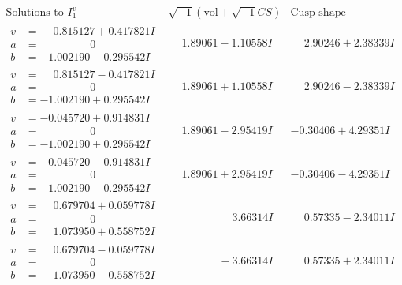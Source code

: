 \documentclass[1p]{elsarticle_modified}
\theoremstyle{definition}
\newcommand{\I}{\sqrt{-1}}
\begin{document}
$$\begin{array}{c|c|c}  
\text{Solutions to }I^v_{1}& \I (\text{vol} + \sqrt{-1}CS) & \text{Cusp shape}\\
 \hline 
\begin{aligned}
v &= \phantom{-}0.815127 + 0.417821 I \\
a &= \phantom{-0.000000 } 0 \\
b &= -1.002190 - 0.295542 I\end{aligned}
 & \phantom{-}1.89061 - 1.10558 I & \phantom{-}2.90246 + 2.38339 I \\ \hline\begin{aligned}
v &= \phantom{-}0.815127 - 0.417821 I \\
a &= \phantom{-0.000000 } 0 \\
b &= -1.002190 + 0.295542 I\end{aligned}
 & \phantom{-}1.89061 + 1.10558 I & \phantom{-}2.90246 - 2.38339 I \\ \hline\begin{aligned}
v &= -0.045720 + 0.914831 I \\
a &= \phantom{-0.000000 } 0 \\
b &= -1.002190 + 0.295542 I\end{aligned}
 & \phantom{-}1.89061 - 2.95419 I & -0.30406 + 4.29351 I \\ \hline\begin{aligned}
v &= -0.045720 - 0.914831 I \\
a &= \phantom{-0.000000 } 0 \\
b &= -1.002190 - 0.295542 I\end{aligned}
 & \phantom{-}1.89061 + 2.95419 I & -0.30406 - 4.29351 I \\ \hline\begin{aligned}
v &= \phantom{-}0.679704 + 0.059778 I \\
a &= \phantom{-0.000000 } 0 \\
b &= \phantom{-}1.073950 + 0.558752 I\end{aligned}
 & \phantom{-0.000000 -}3.66314 I & \phantom{-}0.57335 - 2.34011 I \\ \hline\begin{aligned}
v &= \phantom{-}0.679704 - 0.059778 I \\
a &= \phantom{-0.000000 } 0 \\
b &= \phantom{-}1.073950 - 0.558752 I\end{aligned}
 & \phantom{-0.000000 } -3.66314 I & \phantom{-}0.57335 + 2.34011 I \\ \hline\begin{aligned}

\end{aligned}
\end{array}$$
\end{document}
